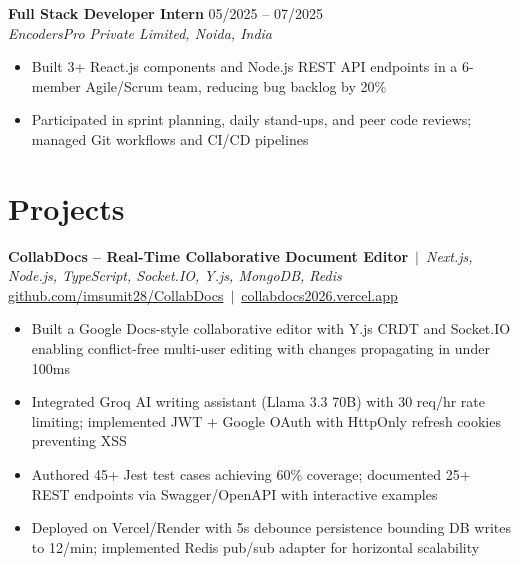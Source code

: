 \documentclass[10pt,letterpaper]{article}
\begin{document}
{\small\textbf{Full Stack Developer Intern} \hfill 05/2025 -- 07/2025 \\
\textit{EncodersPro Private Limited, Noida, India}}
\begin{itemize}
  \item {\small Built 3+ React.js components and Node.js REST API endpoints in a 6-member Agile/Scrum team, reducing bug backlog by 20\%}
  \item {\small Participated in sprint planning, daily stand-ups, and peer code reviews; managed Git workflows and CI/CD pipelines}
\end{itemize}

\section{Projects}

{\small\textbf{CollabDocs -- Real-Time Collaborative Document Editor} \,$|$\, \textit{Next.js, Node.js, TypeScript, Socket.IO, Y.js, MongoDB, Redis}\\
\href{https://github.com/imsumit28/CollabDocs}{github.com/imsumit28/CollabDocs} \,$|$\, \href{https://collabdocs2026.vercel.app}{collabdocs2026.vercel.app}}
\begin{itemize}
  \item {\small Built a Google Docs-style collaborative editor with Y.js CRDT and Socket.IO enabling conflict-free multi-user editing with changes propagating in under 100ms}
  \item {\small Integrated Groq AI writing assistant (Llama 3.3 70B) with 30 req/hr rate limiting; implemented JWT + Google OAuth with HttpOnly refresh cookies preventing XSS}
  \item {\small Authored 45+ Jest test cases achieving 60\% coverage; documented 25+ REST endpoints via Swagger/OpenAPI with interactive examples}
  \item {\small Deployed on Vercel/Render with 5s debounce persistence bounding DB writes to 12/min; implemented Redis pub/sub adapter for horizontal scalability}
\end{itemize}

\vspace{3pt}
\end{document}
